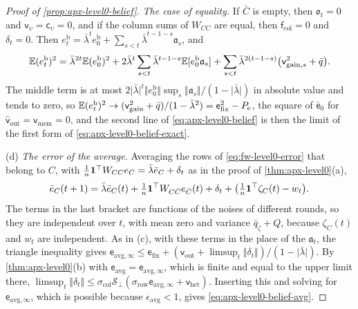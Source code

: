 \begin{proof}[Proof of \cref{prop:apx-level0-belief}]
\emph{The case of equality.} If $\bar C$ is empty, then $\mathfrak o_t=0$ and $\mathsf v_\upsilon=\mathsf c_\upsilon=0$, and if the column sums of $W_{CC}$ are equal, then $\mathsf f_{\mathrm{col}}=0$ and $\delta_t=0$. Then $e^{\mathrm b}_t=\bar\lambda^te^{\mathrm b}_0+\sum_{s<t}\bar\lambda^{t-1-s}\mathfrak a_s$, and
\begin{equation*}
\mathbb{E}(e^{\mathrm b}_t)^2=\bar\lambda^{2t}\mathbb{E}(e^{\mathrm b}_0)^2+2\bar\lambda^t\sum_{s<t}\bar\lambda^{t-1-s}\mathbb{E}[e^{\mathrm b}_0\mathfrak a_s]+\sum_{s<t}\bar\lambda^{2(t-1-s)}\bigl(\mathsf v_{\mathrm{gain},s}^2+\bar q\bigr).
\end{equation*}
The middle term is at most $2\lvert\bar\lambda\rvert^t\Vert e^{\mathrm b}_0\Vert\sup_s\Vert\mathfrak a_s\Vert/(1-\lvert\bar\lambda\rvert)$ in absolute value and tends to zero, so $\mathbb{E}(e^{\mathrm b}_t)^2\to(\mathsf v_{\mathrm{gain}}^2+\bar q)/(1-\bar\lambda^2)=\mathsf e_{\mathrm{fix}}^2-P_{\mathrm e}$, the square of $\bar{\mathsf e}_0$ for $\hat{\mathsf v}_{\mathrm{out}}=\mathsf v_{\mathrm{mem}}=0$, and the second line of \eqref{eq:apx-level0-belief} is then the limit of the first form of \eqref{eq:apx-level0-belief-exact}.

(d) \emph{The error of the average.} Averaging the rows of \eqref{eq:fw-level0-error} that belong to $C$, with $\frac1n\mathbf{1}^\top W_{CC}e_C=\bar\lambda\bar e_C+\delta_t$ as in the proof of \cref{thm:apx-level0}(a),
\begin{equation*}
\bar e_C(t+1)=\bar\lambda\bar e_C(t)+\tfrac1n\mathbf{1}^\top W_{C\bar C}e_{\bar C}(t)+\delta_t+\bigl(\tfrac1n\mathbf{1}^\top\zeta_C(t)-w_t\bigr).
\end{equation*}
The terms in the last bracket are functions of the noises of different rounds, so they are independent over $t$, with mean zero and variance $\bar q_\zeta+Q$, because $\zeta_C(t)$ and $w_t$ are independent. As in (c), with these terms in the place of the $\mathfrak a_t$, the triangle inequality gives $\mathsf e_{\mathrm{avg},\infty}\le\mathsf e_{\mathrm{fix}}+(\mathsf v_{\mathrm{out}}+\limsup_t\Vert\delta_t\Vert)/(1-\lvert\bar\lambda\rvert)$. By \cref{thm:apx-level0}(b) with $\mathsf e_{\mathrm{avg}}=\mathsf e_{\mathrm{avg},\infty}$, which is finite and equal to the upper limit there, $\limsup_t\Vert\delta_t\Vert\le\sigma_{\mathrm{col}}\mathcal S_\perp(\sigma_{\mathrm{row}}\mathsf e_{\mathrm{avg},\infty}+\mathsf v_{\mathrm{het}})$. Inserting this and solving for $\mathsf e_{\mathrm{avg},\infty}$, which is possible because $\epsilon_{\mathrm{avg}}<1$, gives \eqref{eq:apx-level0-belief-avg}.


\end{proof}
